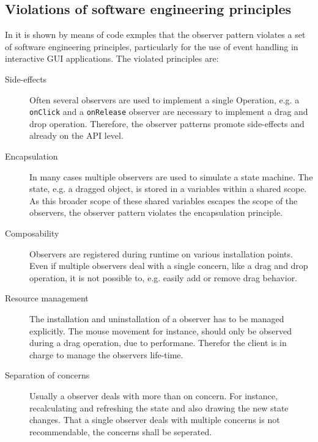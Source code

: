\documentclass[acmsmall]{acmart}\settopmatter{printfolios=true,printccs=false,printacmref=false}
\begin{document}
	\subsection{Violations of software engineering principles}
		In \cite{Maier:2012} it is shown by means of code exmples that the observer pattern violates a set of software engineering principles,
		particularly for the use of event handling in interactive GUI applications.
		The violated principles are:
		\begin{description}
			\item[Side-effects]
			Often several observers are used to implement a single Operation,
			e.g. a \lstinline|onClick| and a \lstinline|onRelease| observer are necessary to implement a drag and drop operation.
			Therefore, the observer patterns promote side-effects and already on the API level.
			
			\item[Encapsulation]
			In many cases multiple observers are used to simulate a state machine. 
			The state, e.g. a dragged object, is stored in a variables within a shared scope.
			As this broader scope of these shared variables escapes the scope of the observers, the observer pattern violates the encapsulation principle.
			
			\item[Composability]
			Observers are registered during runtime on various installation points.
			Even if multiple observers deal with a single concern, like a drag and drop operation, it is not possible to, e.g. easily add or remove drag behavior.
			
			\item[Resource management]
			The installation and uninstallation of a observer has to be managed explicitly.
			The mouse movement for instance, should only be observed during a drag operation, due to performane. 
			Therefor the client is in charge to manage the observers life-time.
			
			\item[Separation of concerns]
			Usually a observer deals with more than on concern. For instance, recalculating and refreshing the state and also drawing the new state changes.
			That a single observer deals with multiple concerns is not recommendable, the concerns shall be seperated.


\end{description}
\end{document}
